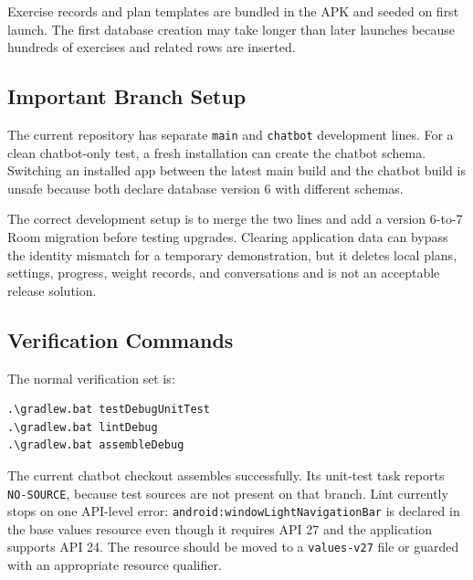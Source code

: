 Exercise records and plan templates are bundled in the APK and seeded on first launch. The first database creation may take longer than later launches because hundreds of exercises and related rows are inserted.

\subsection{Important Branch Setup}

The current repository has separate \texttt{main} and \texttt{chatbot} development lines. For a clean chatbot-only test, a fresh installation can create the chatbot schema. Switching an installed app between the latest main build and the chatbot build is unsafe because both declare database version 6 with different schemas.

The correct development setup is to merge the two lines and add a version 6-to-7 Room migration before testing upgrades. Clearing application data can bypass the identity mismatch for a temporary demonstration, but it deletes local plans, settings, progress, weight records, and conversations and is not an acceptable release solution.

\subsection{Verification Commands}

The normal verification set is:

\begin{lstlisting}
.\gradlew.bat testDebugUnitTest
.\gradlew.bat lintDebug
.\gradlew.bat assembleDebug
\end{lstlisting}

The current chatbot checkout assembles successfully. Its unit-test task reports \texttt{NO-SOURCE}, because test sources are not present on that branch. Lint currently stops on one API-level error: \texttt{android:windowLightNavigationBar} is declared in the base values resource even though it requires API 27 and the application supports API 24. The resource should be moved to a \texttt{values-v27} file or guarded with an appropriate resource qualifier.
